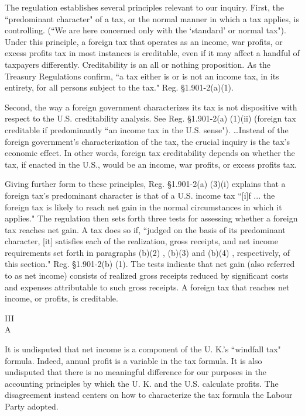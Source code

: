 \begin{select}
The regulation establishes several principles relevant to our inquiry. First, the ``predominant character" of a tax, or the normal manner in which a tax applies, is controlling.  (``We are here concerned only with the `standard' or normal tax"). Under this principle, a foreign tax that operates as an income, war profits, or excess profits tax in most instances is creditable, even if it may affect a handful of taxpayers differently. Creditability is an all or nothing proposition. As the Treasury Regulations confirm, ``a tax either is or is not an income tax, in its entirety, for all persons subject to the tax." Reg. \S1.901-2(a)(1). 

Second, the way a foreign government characterizes its tax is not dispositive with respect to the U.S. creditability analysis. See Reg. \S1.901-2(a) (1)(ii) (foreign tax creditable if predominantly ``an income tax in the U.S. sense"). \ldots Instead of the foreign government's characterization of the tax, the crucial inquiry is the tax's economic effect.  In other words, foreign tax creditability depends on whether the tax, if enacted in the U.S., would be an income, war profits, or excess profits tax.

Giving further form to these principles, Reg. \S1.901-2(a) (3)(i) explains that a foreign tax's predominant character is that of a U.S. income tax ``[i]f ... the foreign tax is likely to reach net gain in the normal circumstances in which it applies." The regulation then sets forth three tests for assessing whether a foreign tax reaches net gain. A tax does so if, ``judged on the basis of its predominant character, [it] satisfies each of the realization, gross receipts, and net income requirements set forth in paragraphs (b)(2) , (b)(3) and (b)(4) , respectively, of this section."  Reg. \S1.901-2(b) (1). The tests indicate that net gain (also referred to as net income) consists of realized gross receipts reduced by significant costs and expenses attributable to such gross receipts. A foreign tax that reaches net income, or profits, is creditable. 

\begin{center}
III \\
A
\end{center}

It is undisputed that net income is a component of the U. K.'s ``windfall tax" formula.  Indeed, annual profit is a variable in the tax formula.  It is also undisputed that there is no meaningful difference for our purposes in the accounting principles by which the U. K. and the U.S. calculate profits.  The disagreement instead centers on how to characterize the tax formula the Labour Party adopted.


\end{select}
